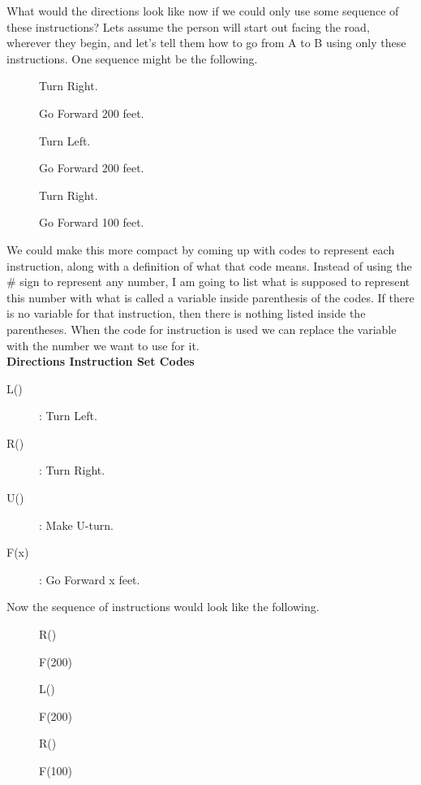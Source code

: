 What would the directions look like now if we could only use some sequence of these instructions? Lets assume the person will start out facing the road, wherever they begin, and let's tell them how to go from A to B using only these instructions. One sequence might be the following.

\begin{description}
	\item[] Turn Right.
	\item[] Go Forward 200 feet.
	\item[] Turn Left.
	\item[] Go Forward 200 feet.
	\item[] Turn Right.
	\item[] Go Forward 100 feet.
\end{description}


We could make this more compact by coming up with codes to represent each instruction, along with a definition of what that code means. Instead of using the \# sign to represent any number, I am going to list what is supposed to represent this number with what is called a variable inside parenthesis of the codes. If there is no variable for that instruction, then there is nothing listed inside the parentheses. When the code for instruction is used we can replace the variable with the number we want to use for it.\\

\textbf{Directions Instruction Set Codes}
\begin{description}
	\item[L()] : Turn Left.
	\item[R()] : Turn Right.
	\item[U()] : Make U-turn.
	\item[F(x)] : Go Forward x feet.
\end{description}

Now the sequence of instructions would look like the following.

\begin{description}
	\item[] R()
	\item[] F(200)
	\item[] L()
	\item[] F(200)
	\item[] R()
	\item[] F(100)
\end{description}

